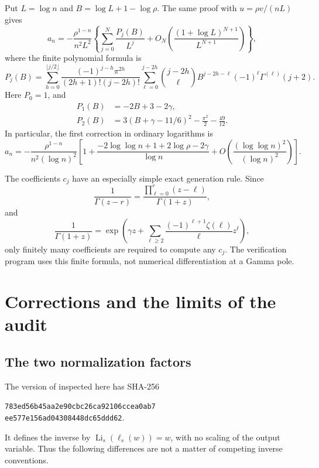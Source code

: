 \documentclass[11pt,a4paper]{article}
\numberwithin{equation}{section}
\theoremstyle{definition}
\theoremstyle{remark}
\DeclareMathOperator{\Li}{Li}
\newcommand{\LiInv}{\ell}
\begin{document}
Put \(L=\log n\) and \(B=\log L+1-\log\rho\).
The same proof with \(u=\rho v/(nL)\) gives
\begin{equation}
 a_n=-\frac{\rho^{1-n}}{n^2L^2}
 \left\{\sum_{j=0}^{N}\frac{P_j(B)}{L^j}
 +O_N\left(\frac{(1+\log L)^{N+1}}{L^{N+1}}\right)\right\},
 \label{eq:dilog-coeff-log}
\end{equation}
where the finite polynomial formula is
\begin{equation}
 P_j(B)=
 \sum_{h=0}^{\lfloor j/2\rfloor}
 \frac{(-1)^{j-h}\pi^{2h}}{(2h+1)!(j-2h)!}
 \sum_{\ell=0}^{j-2h}
 \binom{j-2h}{\ell}B^{j-2h-\ell}(-1)^\ell
 \Gamma^{(\ell)}(j+2).
 \label{eq:Pj}
\end{equation}
Here \(P_0=1\), and
\begin{align}
 P_1(B)&=-2B+3-2\gamma,\nonumber\\
 P_2(B)&=3(B+\gamma-11/6)^2-\frac{\pi^2}{2}-\frac{49}{12}.
 \label{eq:P012}
\end{align}
In particular, the first correction in ordinary logarithms is
\begin{equation}
 a_n=-\frac{\rho^{1-n}}{n^2(\log n)^2}
 \left[
 1+\frac{-2\log\log n+1+2\log\rho-2\gamma}{\log n}
 +O\left(\frac{(\log\log n)^2}{(\log n)^2}\right)
 \right].
 \label{eq:dilog-first-log}
\end{equation}

The coefficients \(c_j\) have an especially simple exact generation
rule.  Since
\[
 \frac1{\Gamma(z-r)}
 =\frac{\prod_{\ell=0}^{r}(z-\ell)}{\Gamma(1+z)},
\]
and
\[
 \frac1{\Gamma(1+z)}
 =\exp\left(\gamma z+
 \sum_{\ell\ge2}\frac{(-1)^{\ell+1}\zeta(\ell)}{\ell}z^\ell\right),
\]
only finitely many coefficients are required to compute any \(c_j\).
The verification program uses this finite formula, not numerical
differentiation at a Gamma pole.

\section{Corrections and the limits of the audit}
\label{sec:audit}

\subsection{The two normalization factors}

The version of \cite{kr} inspected here has SHA-256
\begin{center}\small
\texttt{783ed56b45aa2e90cbc26ca92106ccea0ab7}\\
\texttt{ee577e156ad04308448dc65ddd62}.
\end{center}
It defines the inverse by \(\Li_s(\LiInv_s(w))=w\), with no scaling of
the output variable.  Thus the following differences are not a matter
of competing inverse conventions.
\end{document}

